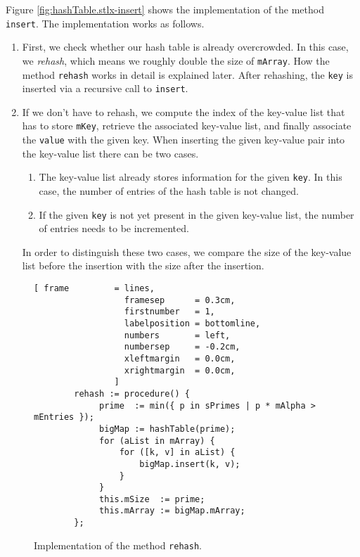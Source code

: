Figure \ref{fig:hashTable.stlx-insert} shows the implementation of the method \texttt{insert}.
The implementation works as follows.
\begin{enumerate}
\item First, we check whether our hash table is already overcrowded.
      In this case, we \emph{rehash}, which means we roughly double the size of \texttt{mArray}.
      How the method \texttt{rehash} works in detail is explained later.
      After rehashing, the \texttt{key} is inserted via a recursive call to \texttt{insert}.
\item If we don't have to rehash, we compute the index of the key-value list that has to store
      \texttt{mKey}, retrieve the associated key-value list, and finally associate the
      \texttt{value} with the given key.  When inserting the given key-value
      pair into the key-value list there can be two cases.
      \begin{enumerate}
      \item The key-value list already stores information for the given \texttt{key}.
            In this case, the number of entries of the hash table is not changed.
      \item If the given \texttt{key} is not yet present in the given key-value list,
            the number of entries needs to be incremented.
      \end{enumerate}
      In order to distinguish these two cases, we compare the size of the key-value list before
      the insertion with the size after the insertion.     
\end{enumerate}


\begin{figure}[!ht]
\centering
\begin{Verbatim}[ frame         = lines, 
                  framesep      = 0.3cm, 
                  firstnumber   = 1,
                  labelposition = bottomline,
                  numbers       = left,
                  numbersep     = -0.2cm,
                  xleftmargin   = 0.0cm,
                  xrightmargin  = 0.0cm,
                ]
        rehash := procedure() {
             prime  := min({ p in sPrimes | p * mAlpha > mEntries });
             bigMap := hashTable(prime);
             for (aList in mArray) {
                 for ([k, v] in aList) {
                     bigMap.insert(k, v);
                 }    
             }
             this.mSize  := prime;
             this.mArray := bigMap.mArray;
        };
\end{Verbatim}
\vspace*{-0.3cm}
\caption{Implementation of the method \texttt{rehash}.}
\label{fig:hashTable.stlx-rehash}
\end{figure}


